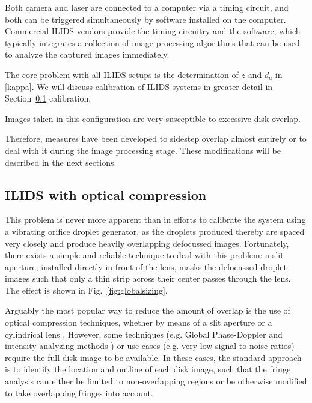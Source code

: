 \documentclass[11.5pt]{book}
\newcommand*{\figref}[1]{Fig.~\ref{#1}}
\newcommand*{\secref}[1]{Section~\ref{#1}}
\begin{document}
Both camera and laser are connected to a computer via a timing circuit, and both
can be triggered simultaneously by software installed on the computer.
Commercial ILIDS vendors provide the timing circuitry and the software, which
typically integrates a collection of image processing algorithms that can be
used to analyze the captured images immediately.

The core problem with all ILIDS setups is the determination of $z$ and $d_a$ in
\eqref{kappa}.  We will discuss calibration of ILIDS systems in greater detail in
\secref{} calibration.

Images taken in this configuration are very susceptible to excessive
disk overlap.


Therefore, measures have been developed to sidestep overlap
almost entirely or to deal with it during the image processing stage. These
modifications will be described in the next sections.

\subsection{ILIDS with optical compression}
This problem is never more apparent than in efforts to calibrate
the system using a vibrating orifice droplet generator, as the droplets produced
thereby are spaced very closely and produce heavily overlapping defocussed
images. Fortunately, there exists a simple and reliable technique to deal with
this problem: a slit aperture, installed directly in front of the lens, masks
the defocussed droplet images such that only a thin strip across their center
passes through the lens. The effect is shown in \figref{fig:globalsizing}. 

Arguably the most popular way to reduce the amount of overlap is the use of
optical compression techniques, whether by means of a slit aperture \cite{Pan06}
or a cylindrical lens \cite{Kawaguchi02, Maeda02}. However, some techniques
(e.g. Global Phase-Doppler \cite{Damaschke01} and intensity-analyzing
methods \cite{Querel10}) or use cases (e.g. very low signal-to-noise ratios)
require the full disk image to be available. In these cases, the standard
approach is to identify the location and outline of each disk image, such that
the fringe analysis can either be limited to non-overlapping regions or be
otherwise modified to take overlapping fringes into account.
\end{document}
